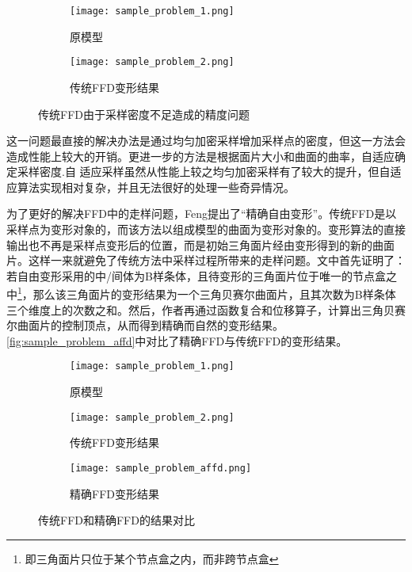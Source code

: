 \begin{figure}[htbp]
	\centering
	\begin{subfigure}[b]{.4\textwidth}
		\centering
		\texttt{[image: sample\_problem\_1.png]}
		\caption{原模型}\label{subfig:sample_problem_0}
	\end{subfigure}
	\quad
	\begin{subfigure}[b]{.4\textwidth}
		\centering
		\texttt{[image: sample\_problem\_2.png]}
		\caption{传统FFD变形结果}\label{subfig:sample_problem_1}
	\end{subfigure}
    \caption{传统FFD由于采样密度不足造成的精度问题}\label{fig:sample_problem}
\end{figure}

这一问题最直接的解决办法是通过均匀加密采样增加采样点的密度，但这一方法会造成性能上较大的开销。更进一步的方法\cite{parry1986, gain1999}是根据面片大小和曲面的曲率，自适应确定采样密度.自
适应采样虽然从性能上较之均匀加密采样有了较大的提升，但自适应算法实现相对复杂，并且无法很好的处理一些奇异情况。


为了更好的解决FFD中的走样问题，Feng\cite{Feng98}提出了“精确自由变形”。传统FFD是以采样点为变形对象的，而该方法以组成模型的曲面为变形对象的。变形算法的直接输出也不再是采样点变形后的位置，而是初始三角面片经由变形得到的新的曲面片。这样一来就避免了传统方法中采样过程所带来的走样问题。文中首先证明了：若自由变形采用的中/间体为B样条体，且待变形的三角面片位于唯一的节点盒之中\footnote{即三角面片只位于某个节点盒之内，而非跨节点盒}，那么该三角面片的变形结果为一个三角贝赛尔曲面片，且其次数为B样条体三个维度上的次数之和。然后，作者再通过函数复合\cite{derose1988, derose1993}和位移算子\cite{chang1984}，计算出三角贝赛尔曲面片的控制顶点，从而得到精确而自然的变形结果。\autoref{fig:sample_problem_affd}中对比了精确FFD与传统FFD的变形结果。

\begin{figure}[htbp]
	\centering
	\begin{subfigure}[b]{.3\textwidth}
		\centering
		\texttt{[image: sample\_problem\_1.png]}
		\caption{原模型}
	\end{subfigure}
	\quad
	\begin{subfigure}[b]{.3\textwidth}
		\centering
		\texttt{[image: sample\_problem\_2.png]}
		\caption{传统FFD变形结果}
	\end{subfigure}
	\quad
	\begin{subfigure}[b]{.3\textwidth}
		\centering
		\texttt{[image: sample\_problem\_affd.png]}
		\caption{精确FFD变形结果}
	\end{subfigure}
    \caption{传统FFD和精确FFD的结果对比}\label{fig:sample_problem_affd}
\end{figure}

